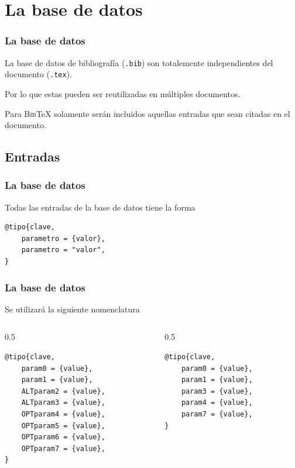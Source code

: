 \documentclass[12pt,aspectratio=169,ignorenonframetext]{ltxbeamer}
\newcommand{\BibTeX}{\textsc{Bib}\TeX}
\begin{document}
\section{La base de datos}

\begin{frame}
\frametitle{La base de datos}

La base de datos de bibliografía (\texttt{.bib}) son totalemente independientes del documento (\texttt{.tex}).

Por lo que estas pueden ser reutilizadas en múltiples documentos.

Para {\lmr\BibTeX} solamente serán incluidos aquellas entradas que sean citadas en el documento.
\end{frame}





\subsection{Entradas}

\begin{frame}[fragile]
\frametitle{La base de datos}

Todas las entradas de la base de datos tiene la forma

\begin{verbatim}
@tipo{clave,
    parametro = {valor},
    parametro = "valor",
}
\end{verbatim}
\end{frame}





\begin{frame}[fragile]
\frametitle{La base de datos}

Se utilizará la siguiente nomenclatura

\begin{columns}
    \begin{column}{0.5\textwidth}
        \begin{verbatim}
@tipo{clave,
    param0 = {value},
    param1 = {value},
    ALTparam2 = {value},
    ALTparam3 = {value},
    OPTparam4 = {value},
    OPTparam5 = {value},
    OPTparam6 = {value},
    OPTparam7 = {value},
}
        \end{verbatim}
    \end{column}
    \pause
    \begin{column}{0.5\linewidth}
        \begin{verbatim}
@tipo{clave,
    param0 = {value},
    param1 = {value},
    param3 = {value},
    param4 = {value},
    param7 = {value},
}
        \end{verbatim}
    \end{column}
\end{columns}
\end{frame}
\end{document}
